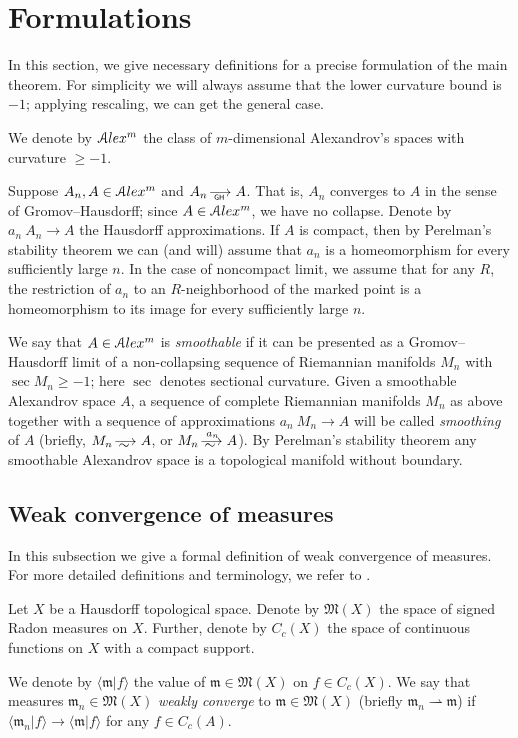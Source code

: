 \section{Formulations}

In this section, we give necessary definitions for a precise formulation of the main theorem.
For simplicity  we will always assume that the lower
curvature bound is  $-1$;
applying rescaling, we can get the general case.

We denote by
$\mathcal{A}lex^m$ the class of $m$-dimensional Alexandrov's spaces
with curvature $\ge -1$.

Suppose $A_n, A\in \mathcal{A}lex^m$ and $A_n\GHto A$.
That is, $A_n$ converges to 
$A$ in the sense of Gromov--Hausdorff;
since $A\in \mathcal{A}lex^m$, we have no collapse.
Denote by $a_n\:A_n\to A$ the Hausdorff approximations.
If $A$ is compact, then
by Perelman's stability theorem \cite{PerStab,KapStab} we can (and will) assume that $a_n$ is a homeomorphism for every sufficiently large $n$.
In the case of noncompact limit, we assume that for any $R$, the restriction of $a_n$ to an $R$-neighborhood of the marked point is a homeomorphism to its image for every sufficiently large $n$.

We say that $A\in \mathcal{A}lex^m$ is \emph{smoothable}
if it can be presented as a Gromov--Hausdorff limit of a non-collapsing sequence of Riemannian manifolds $M_n$ with $\sec M_n\ge-1$; here $\sec$ denotes sectional curvature.
Given a smoothable Alexandrov space $A$,
a sequence of complete Riemannian manifolds $M_n$ as above
together with a sequence of approximations $a_n\:M_n\to A$
will be called \emph{smoothing} of $A$
(briefly, $M_n\smooths{} A$, or $M_n\smooths{a_n} A$).
By Perelman's stability theorem any smoothable Alexandrov space is a topological manifold without boundary.

\subsection{Weak convergence of measures}

In this subsection we give a formal definition of weak convergence of measures.
For more detailed definitions and terminology, we refer to
\cite{GMS}.

Let $X$ be a Hausdorff topological space.
Denote by $\mathfrak M(X)$ the space of signed Radon measures on $X$.
Further, denote by $C_c(X)$  the space of continuous functions on $X$
with a compact support. 

We  denote by $\langle \mathfrak m|f\rangle $ the value of $\mathfrak m\in\mathfrak M(X)$ on $f\in C_c(X)$.
We say that measures $\mathfrak m_n\in \mathfrak M(X)$ \emph{weakly converge} to $\mathfrak m\in \mathfrak M(X)$ (briefly
$\mathfrak m_n\rightharpoonup \mathfrak m$) if $\langle \mathfrak m_n|f\rangle \to \langle \mathfrak m|f\rangle $ for any $f\in C_c(A)$.

